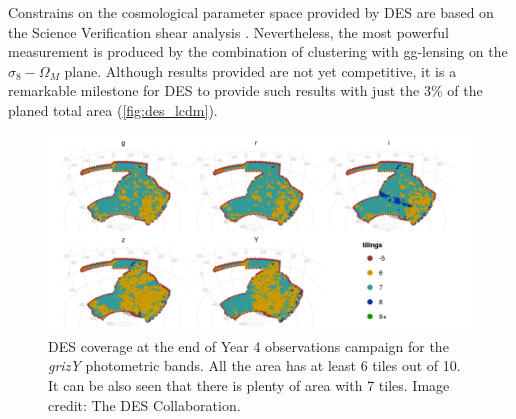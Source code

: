 Constrains on the cosmological parameter space  provided by DES are based on the Science Verification shear analysis \cite{2016PhRvD..94b2001A,2016MNRAS.463.3653K}. Nevertheless, the most powerful measurement is produced by the combination of clustering with gg-lensing \cite{2017MNRAS.464.4045K} on the $\sigma_8-\Omega_M$ plane. Although results provided are not yet competitive, it is a remarkable milestone for DES to provide such results with just the 3\% of the planed total area (\autoref{fig:des_lcdm}).
\begin{figure}
\begin{center}
\includegraphics[width=\textwidth]{./Pictures/des_tiles.png}
\caption{DES coverage at the end of Year 4 observations campaign for the {\it grizY} photometric bands. All the area has at least 6 tiles out of 10. It can be also seen that there is plenty of area with 7 tiles. Image credit: The DES Collaboration.}
\label{fig:des_coverage}
\end{center}
\end{figure}
